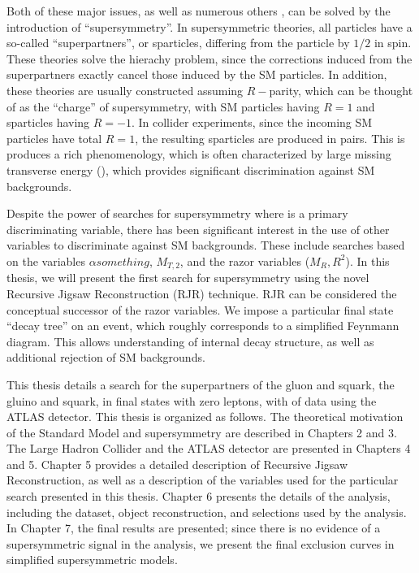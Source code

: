 Both of these major issues, as well as numerous others , can be solved by the introduction of ``supersymmetry''.
In supersymmetric theories, all particles have a so-called ``superpartners'', or sparticles, differing from the particle by $1/2$ in spin.
These theories solve the hierachy problem, since the corrections induced from the superpartners exactly cancel those induced by the SM particles.
In addition, these theories are usually constructed assuming $R-$parity, which can be thought of as the ``charge'' of supersymmetry, with SM particles having $R=1$ and sparticles having $R=-1$.
In collider experiments, since the incoming SM particles have total $R=1$, the resulting sparticles are produced in pairs.
This is produces a rich phenomenology, which is often characterized by large missing transverse energy (\met), which provides significant discrimination against SM backgrounds.

Despite the power of searches for supersymmetry where \met is a primary discriminating variable, there has been significant interest in the use of other variables to discriminate against SM backgrounds.
These include searches based on the variables $\alpha{something}$, $ M_{T,2}$, and the razor variables ($M_R, R^2$). 
In this thesis, we will present the first search for supersymmetry using the novel Recursive Jigsaw Reconstruction (RJR) technique.
RJR can be considered the conceptual successor of the razor variables.
We impose a particular final state ``decay tree'' on an event, which roughly corresponds to a simplified Feynmann diagram.
This allows understanding of internal decay structure, as well as additional rejection of SM backgrounds.

This thesis details a search for the superpartners of the gluon and squark, the gluino and squark, in final states with zero leptons, with \todo{ 7 \ifb} of data using the ATLAS detector.
This thesis is organized as follows.
The theoretical motivation of the Standard Model and supersymmetry are described in Chapters 2 and 3.
The Large Hadron Collider and the ATLAS detector are presented in Chapters 4 and 5.
Chapter 5 provides a detailed description of Recursive Jigsaw Reconstruction, as well as a description of the variables used for the particular search presented in this thesis.
Chapter 6 presents the details of the analysis, including the dataset, object reconstruction, and selections used by the analysis.
In Chapter 7, the final results are presented; since there is no evidence of a supersymmetric signal in the analysis, we present the final exclusion curves in simplified supersymmetric models.